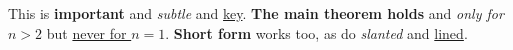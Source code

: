 This is \textbf{important} and \textit{subtle} and \underline{key}.
\textbf{The main theorem holds} and \textit{only for $n > 2$} but \underline{never for $n = 1$}.
\textbf{Short form} works too, as do \textit{slanted} and \underline{lined}.